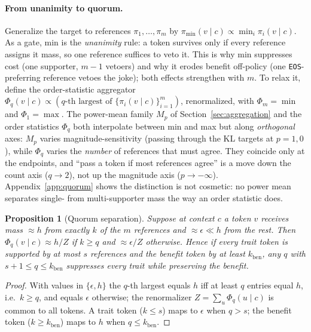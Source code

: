 \documentclass[11pt]{article}
\newtheorem{proposition}{Proposition}
\begin{document}
\paragraph{From unanimity to quorum.} Generalize the target to references $\pi_1, \dots, \pi_m$ by $\pi_{\min}(v \mid c) \propto \min_i \pi_i(v \mid c)$. As a gate, min is the \emph{unanimity} rule: a token survives only if every reference assigns it mass, so one reference suffices to veto it. This is why min suppresses cost (one supporter, $m-1$ vetoers) and why it erodes benefit off-policy (one \texttt{EOS}-preferring reference vetoes the joke); both effects strengthen with $m$. To relax it, define the order-statistic aggregator $\Phi_q(v \mid c) \propto (q\text{-th largest of } \{\pi_i(v \mid c)\}_{i=1}^m)$, renormalized, with $\Phi_m = \min$ and $\Phi_1 = \max$. The power-mean family $M_p$ of Section~\ref{sec:aggregation} and the order statistics $\Phi_q$ both interpolate between min and max but along \emph{orthogonal} axes: $M_p$ varies magnitude-sensitivity (passing through the KL targets at $p = 1, 0$), while $\Phi_q$ varies the \emph{number} of references that must agree. They coincide only at the endpoints, and ``pass a token if most references agree'' is a move down the count axis ($q \to 2$), not up the magnitude axis ($p \to -\infty$). Appendix~\ref{app:quorum} shows the distinction is not cosmetic: no power mean separates single- from multi-supporter mass the way an order statistic does.

\begin{proposition}[Quorum separation]
\label{prop:quorum}
Suppose at context $c$ a token $v$ receives mass $\approx h$ from exactly $k$ of the $m$ references and $\approx \epsilon \ll h$ from the rest. Then $\Phi_q(v \mid c) \approx h/Z$ if $k \ge q$ and $\approx \epsilon/Z$ otherwise. Hence if every trait token is supported by at most $s$ references and the benefit token by at least $k_{\mathrm{ben}}$, any $q$ with $s + 1 \le q \le k_{\mathrm{ben}}$ suppresses every trait while preserving the benefit.
\end{proposition}

\begin{proof}
With values in $\{\epsilon, h\}$ the $q$-th largest equals $h$ iff at least $q$ entries equal $h$, i.e.\ $k \ge q$, and equals $\epsilon$ otherwise; the renormalizer $Z = \sum_u \Phi_q(u \mid c)$ is common to all tokens. A trait token ($k \le s$) maps to $\epsilon$ when $q > s$; the benefit token ($k \ge k_{\mathrm{ben}}$) maps to $h$ when $q \le k_{\mathrm{ben}}$.
\end{proof}
\end{document}
